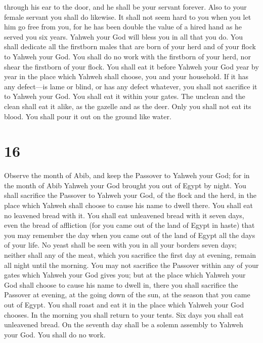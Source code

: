 through his ear to the door, and he shall be your servant forever. Also
to your female servant you shall do likewise.  It shall not
seem hard to you when you let him go free from you, for he has been
double the value of a hired hand as he served you six years. Yahweh your
God will bless you in all that you do.  You shall dedicate
all the firstborn males that are born of your herd and of your flock to
Yahweh your God. You shall do no work with the firstborn of your herd,
nor shear the firstborn of your flock.  You shall eat it
before Yahweh your God year by year in the place which Yahweh shall
choose, you and your household.  If it has any defect---is
lame or blind, or has any defect whatever, you shall not sacrifice it to
Yahweh your God.  You shall eat it within your gates. The
unclean and the clean shall eat it alike, as the gazelle and as the
deer.  Only you shall not eat its blood. You shall pour it
out on the ground like water.

\hypertarget{section-15}{%
\section{16}\label{section-15}}

 Observe the month of Abib, and keep the Passover to Yahweh
your God; for in the month of Abib Yahweh your God brought you out of
Egypt by night.  You shall sacrifice the Passover to Yahweh
your God, of the flock and the herd, in the place which Yahweh shall
choose to cause his name to dwell there.  You shall eat no
leavened bread with it. You shall eat unleavened bread with it seven
days, even the bread of affliction (for you came out of the land of
Egypt in haste) that you may remember the day when you came out of the
land of Egypt all the days of your life.  No yeast shall be
seen with you in all your borders seven days; neither shall any of the
meat, which you sacrifice the first day at evening, remain all night
until the morning.  You may not sacrifice the Passover
within any of your gates which Yahweh your God gives you; 
but at the place which Yahweh your God shall choose to cause his name to
dwell in, there you shall sacrifice the Passover at evening, at the
going down of the sun, at the season that you came out of Egypt.
 You shall roast and eat it in the place which Yahweh your
God chooses. In the morning you shall return to your tents. 
Six days you shall eat unleavened bread. On the seventh day shall be a
solemn assembly to Yahweh your God. You shall do no work.

